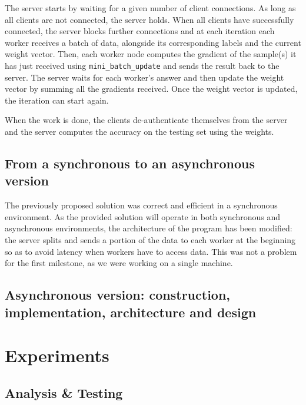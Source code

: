 \documentclass[a4paper, 11pt]{article}
\begin{document}
The server starts by waiting for a given number of client connections. As long as all clients are not connected, the server holds. When all clients have successfully connected, the server blocks further connections and at each iteration each worker receives a batch of data, alongside its corresponding labels and the current weight vector. Then, each worker node computes the gradient of the sample(s) it has just received using \texttt{mini\_batch\_update} and sends the result back to the server. The server waits for each worker's answer and then update the weight vector by summing all the gradients received. Once the weight vector is updated, the iteration can start again.

When the work is done, the clients de-authenticate themselves from the server and the server computes the accuracy on the testing set using the weights.

\subsection*{From a synchronous to an asynchronous version}
The previously proposed solution was correct and efficient in a synchronous environment. As the provided solution will operate in both synchronous and asynchronous environments, the architecture of the program has been modified: the server splits and sends a portion of the data to each worker at the beginning so as to avoid latency when workers have to access data. This was not a problem for the first milestone, as we were working on a single machine. 

\subsection*{Asynchronous version: construction, implementation, architecture and design}
\section*{Experiments}





\subsection*{Analysis \& Testing}
\end{document}
